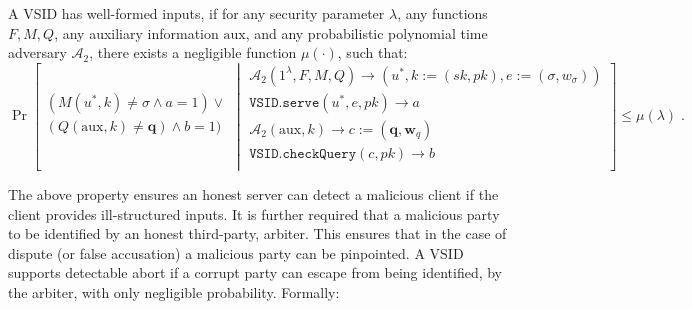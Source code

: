 \begin{definition}\label{deff::VSID-Inputs-Well-formedess}  A  VSID  has  well-formed inputs,   if for any security parameter $\lambda$, any  functions $F,M,Q$,  any auxiliary information $\text{aux}$, and  any probabilistic polynomial time adversary $\mathcal{A}_{\scriptscriptstyle 2}$, there exists a negligible function $\mu(\cdot)$, such that: 
\small{
$$ \Pr\left[
  \begin{array}{l}
  (M(u^{\scriptscriptstyle *},k)\neq \sigma \wedge a=1) \vee\\ (Q(\text{aux},k)\neq \bm{q}) \wedge  b=1)\\
\end{array} \middle |
    \begin{array}{l}
    
    \mathcal{A}_{\scriptscriptstyle 2}(1^{\scriptscriptstyle\lambda},F,M,Q)\rightarrow (u^{\scriptscriptstyle *},k:=(sk,pk),e:=(\sigma,w_{\sigma}))\\
    \mathtt{VSID.serve}(u^{\scriptscriptstyle *},e,pk)\rightarrow a\\
       \mathcal{A}_{\scriptscriptstyle 2}(\text{aux},k)\rightarrow c:=(\bm{q},\bm{w}_{\scriptscriptstyle q})\\
    \mathtt{VSID.checkQuery}(c, pk)\rightarrow b\\
\end{array}    \right]\leq \mu(\lambda)\;.$$
}

\end{definition}

The   above property ensures an honest server can detect  a malicious client if the client provides ill-structured inputs. It is further required that a malicious party to be identified by an honest third-party, arbiter. This ensures that in the case of dispute (or false accusation) a malicious party can be pinpointed. A VSID supports  detectable abort if a corrupt party can escape from being identified, by the arbiter,  with only negligible probability.  Formally:



